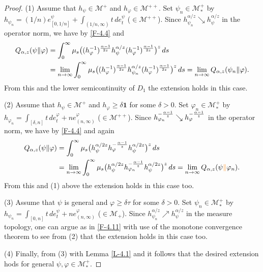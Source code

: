 \documentclass[12pt]{article}
\theoremstyle{definition}
\theoremstyle{remark}
\numberwithin{equation}{section}
\def\Me{\mathcal M}
\def\ffi{\varphi}
\def\1{\mathbf{1}}
\begin{document}
\begin{proof}
(1)\enspace
Assume that $h_\psi\in\Me^+$ and $h_\ffi\in\Me^{++}$. Set $\psi_n\in\Me_*^+$ by
$h_{\psi_n}=(1/n)e_{[0,1/n]}^\psi+\int_{(1/n,\infty)}t\,de_t^\psi$ ($\in\Me^{++}$). Since
$h_{\psi_n}^{\alpha/z}\searrow h_\psi^{\alpha/z}$ in the operator norm, we have by \eqref{F-4.4} and
\cite[Lemma 3.4]{fack1986generalized}
\begin{equation}\label{F-4.11}
\begin{aligned}
Q_{\alpha,z}(\psi\|\ffi)&=\int_0^\infty\mu_s\bigl((h_\ffi^{-1})^{\alpha-1\over2z}h_\psi^{\alpha/z}
(h_\ffi^{-1})^{\alpha-1\over2z}\bigr)^z\,ds \\
&=\lim_{n\to\infty}\int_0^\infty\mu_s\bigl((h_\ffi^{-1})^{\alpha-1\over2z}h_{\psi_n}^{\alpha/z}
(h_\ffi^{-1})^{\alpha-1\over2z}\bigr)^z\,ds
=\lim_{n\to\infty}Q_{\alpha,z}(\psi_n\|\ffi).
\end{aligned}
\end{equation}
From this and the lower semicontinuity of $D_1$ the extension holds in this case.

(2)\enspace
Assume that $h_\psi\in\Me^+$ and $h_\ffi\ge\delta\1$ for some $\delta>0$. Set $\ffi_n\in\Me_*^+$
by $h_{\ffi_n}=\int_{[\delta,n]}t\,de_t^\ffi+ne_{(n,\infty)}^\ffi$ ($\in\Me^{++}$). Since
$h_{\ffi_n}^{-{\alpha-1\over z}}\searrow h_\ffi^{-{\alpha-1\over z}}$ in the operator norm, we have by
\eqref{F-4.4} and \cite[Lemma 3.4]{fack1986generalized} again
\begin{align*}
Q_{\alpha,z}(\psi\|\ffi)&=\int_0^\infty\mu_s\bigl(h_\psi^{\alpha/2z}h_\ffi^{-{\alpha-1\over z}}
h_\psi^{\alpha/2z}\bigr)^z\,ds \\
&=\lim_{n\to\infty}\int_0^\infty\mu_s\bigl(h_\psi^{\alpha/2z}h_{\ffi_n}^{-{\alpha-1\over z}}
h_\psi^{\alpha/2z}\bigr)^z\,ds
=\lim_{n\to\infty}Q_{\alpha,z}(\psi{\color{orange}\|}\ffi_n).
\end{align*}
From this and (1) above the extension holds in this case too.

(3)\enspace
Assume that $\psi$ is general and $\ffi\ge\delta\tau$ for some $\delta>0$. Set $\psi_n\in\Me_*^+$
by $h_{\psi_n}=\int_{[0,n]}t\,de_t^\psi+ne_{(n,\infty)}^\ffi$ ($\in\Me_+$). Since
$h_{\psi_n}^{\alpha/z}\nearrow h_\psi^{\alpha/z}$ in the measure topology, one can argue as in \eqref{F-4.11}
with use of the monotone convergence theorem to see from (2) that the extension holds in this case too.

(4)\enspace
Finally, from (3) with Lemma \ref{L-4.1} and \cite[Corollary 2.8(3)]{hiai2021quantum} it follows that
the desired extension hods for general $\psi,\ffi\in\Me_*^+$.
\end{proof}
\end{document}
